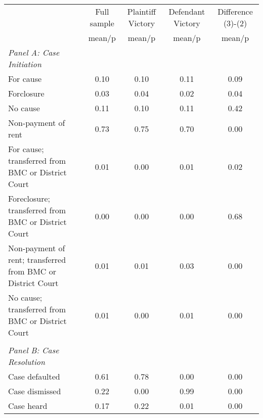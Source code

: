 {
\def\sym#1{\ifmmode^{#1}\else\(^{#1}\)\fi}
\begin{tabular}{l*{4}{c}}
\toprule
                    &\multicolumn{1}{c}{Full sample}&\multicolumn{1}{c}{Plaintiff Victory}&\multicolumn{1}{c}{Defendant Victory}&\multicolumn{1}{c}{Difference (3)-(2)}\\
                    &      mean/p&      mean/p&      mean/p&      mean/p\\
\midrule
\emph{Panel A: Case Initiation}&            &            &            &            \\
\hspace{0.25cm}For cause&       0.10 &       0.10 &       0.11 &        0.09\\
\hspace{0.25cm}Forclosure&       0.03 &       0.04 &       0.02 &        0.04\\
\hspace{0.25cm}No cause&       0.11 &       0.10 &       0.11 &        0.42\\
\hspace{0.25cm}Non-payment of rent&       0.73 &       0.75 &       0.70 &        0.00\\
\hspace{0.25cm}For cause; transferred from BMC or District Court&       0.01 &       0.00 &       0.01 &        0.02\\
\hspace{0.25cm}Foreclosure; transferred from BMC or District Court&       0.00 &       0.00 &       0.00 &        0.68\\
\hspace{0.25cm}Non-payment of rent; transferred from BMC or District Court&       0.01 &       0.01 &       0.03 &        0.00\\
\hspace{0.25cm}No cause; transferred from BMC or District Court&       0.01 &       0.00 &       0.01 &        0.00\\
\vspace{0.1em} \\ \emph{Panel B: Case Resolution}&            &            &            &            \\
\hspace{0.25cm}Case defaulted&       0.61 &       0.78 &       0.00 &        0.00\\
\hspace{0.25cm}Case dismissed&       0.22 &       0.00 &       0.99 &        0.00\\
\hspace{0.25cm}Case heard&       0.17 &       0.22 &       0.01 &        0.00\\

\end{tabular}}
